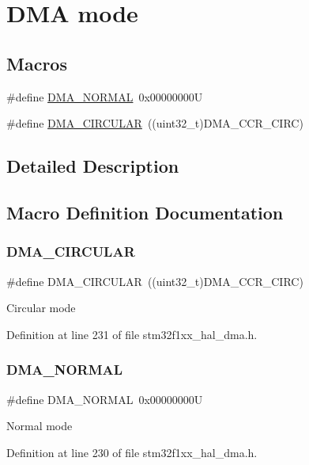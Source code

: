 \hypertarget{group___d_m_a__mode}{}\section{D\+MA mode}
\label{group___d_m_a__mode}
\subsection*{Macros}
\begin{DoxyCompactItemize}
\item 
\#define \hyperlink{group___d_m_a__mode_ga04941acfbbdefc53e1e08133cffa3b8a}{D\+M\+A\+\_\+\+N\+O\+R\+M\+AL}~0x00000000U
\item 
\#define \hyperlink{group___d_m_a__mode_ga4c4f425cba13edffb3c831c036c91e01}{D\+M\+A\+\_\+\+C\+I\+R\+C\+U\+L\+AR}~((uint32\+\_\+t)D\+M\+A\+\_\+\+C\+C\+R\+\_\+\+C\+I\+RC)
\end{DoxyCompactItemize}


\subsection{Detailed Description}


\subsection{Macro Definition Documentation}
\mbox{\label{group___d_m_a__mode_ga4c4f425cba13edffb3c831c036c91e01}} 
\subsubsection{\texorpdfstring{D\+M\+A\+\_\+\+C\+I\+R\+C\+U\+L\+AR}{DMA\_CIRCULAR}}
{\footnotesize\ttfamily \#define D\+M\+A\+\_\+\+C\+I\+R\+C\+U\+L\+AR~((uint32\+\_\+t)D\+M\+A\+\_\+\+C\+C\+R\+\_\+\+C\+I\+RC)}

Circular mode 

Definition at line 231 of file stm32f1xx\+\_\+hal\+\_\+dma.\+h.

\mbox{\label{group___d_m_a__mode_ga04941acfbbdefc53e1e08133cffa3b8a}} 
\subsubsection{\texorpdfstring{D\+M\+A\+\_\+\+N\+O\+R\+M\+AL}{DMA\_NORMAL}}
{\footnotesize\ttfamily \#define D\+M\+A\+\_\+\+N\+O\+R\+M\+AL~0x00000000U}

Normal mode 

Definition at line 230 of file stm32f1xx\+\_\+hal\+\_\+dma.\+h.

